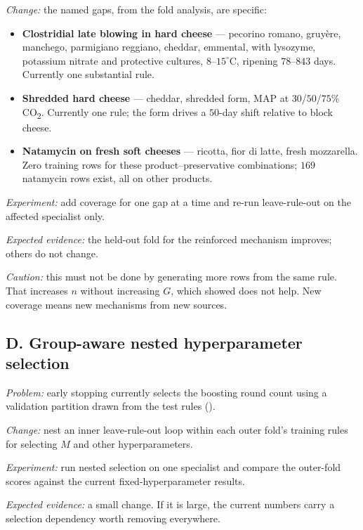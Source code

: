 \emph{Change:} the named gaps, from the fold analysis, are specific:
\begin{itemize}[leftmargin=1.2em, itemsep=1pt]
\item \textbf{Clostridial late blowing in hard cheese} --- pecorino
  romano, gruyère, manchego, parmigiano reggiano, cheddar, emmental, with
  lysozyme, potassium nitrate and protective cultures, $8$--$15^\circ$C,
  ripening $78$--$843$ days. Currently one substantial rule.
\item \textbf{Shredded hard cheese} --- cheddar, shredded form, MAP at
  $30$/$50$/$75\%$ CO\textsubscript{2}. Currently one rule; the form
  drives a $50$-day shift relative to block cheese.
\item \textbf{Natamycin on fresh soft cheeses} --- ricotta, fior di latte,
  fresh mozzarella. Zero training rows for these product--preservative
  combinations; $169$ natamycin rows exist, all on other products.
\end{itemize}

\emph{Experiment:} add coverage for one gap at a time and re-run
leave-rule-out on the affected specialist only.

\emph{Expected evidence:} the held-out fold for the reinforced mechanism
improves; others do not change.

\emph{Caution:} this must not be done by generating more rows from the
same rule. That increases $n$ without increasing $G$, which
 showed does not help. New coverage means new
mechanisms from new sources.

\subsection{D. Group-aware nested hyperparameter selection}

\emph{Problem:} early stopping currently selects the boosting round count
using a validation partition drawn from the test rules
().

\emph{Change:} nest an inner leave-rule-out loop within each outer fold's
training rules for selecting $M$ and other hyperparameters.

\emph{Experiment:} run nested selection on one specialist and compare the
outer-fold scores against the current fixed-hyperparameter results.

\emph{Expected evidence:} a small change. If it is large, the current
numbers carry a selection dependency worth removing everywhere.

